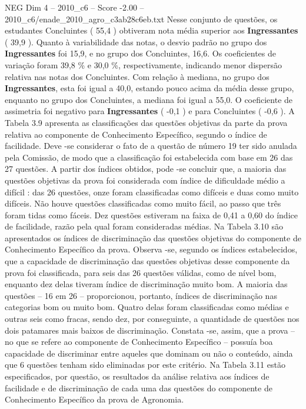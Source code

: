 \begin{textsample}{NEG Dim 4 – 2010\_c6 – Score -2.00 – 2010\_c6/enade\_2010\_agro\_c3ab28c6eb.txt}
Nesse conjunto de questões, os estudantes Concluintes ( 55,4 ) obtiveram nota média superior aos \textbf{Ingressantes} ( 39,9 ).
Quanto à variabilidade das notas, o desvio padrão no grupo dos \textbf{Ingressantes} foi 15,9, e no grupo dos Concluintes, 16,6.
Os coeficientes de variação foram 39,8 \% e 30,0 \%, respectivamente, indicando menor dispersão relativa nas notas dos Concluintes.
Com relação à mediana, no grupo dos \textbf{Ingressantes}, esta foi igual a 40,0, estando pouco acima da média desse grupo, enquanto no grupo dos Concluintes, a mediana foi igual a 55,0.
O coeficiente de assimetria foi negativo para \textbf{Ingressantes} ( -0,1 ) e para Concluintes ( -0,6 ).
A Tabela 3.9 apresenta as classificações das questões objetivas da parte da prova relativa ao componente de Conhecimento Específico, segundo o índice de facilidade.
Deve -se considerar o fato de a questão de número 19 ter sido anulada pela Comissão, de modo que a classificação foi estabelecida com base em 26 das 27 questões.
A partir dos índices obtidos, pode -se concluir que, a maioria das questões objetivas da prova foi considerada com índice de dificuldade médio a difícil : das 26 questões, onze foram classificadas como difíceis e duas como muito difíceis.
Não houve questões classificadas como muito fácil, ao passo que três foram tidas como fáceis.
Dez questões estiveram na faixa de 0,41 a 0,60 do índice de facilidade, razão pela qual foram consideradas médias.
Na Tabela 3.10 são apresentados os índices de discriminação das questões objetivas do componente de Conhecimento Específico da prova.
Observa -se, segundo os índices estabelecidos, que a capacidade de discriminação das questões objetivas desse componente da prova foi classificada, para seis das 26 questões válidas, como de nível bom, enquanto dez delas tiveram índice de discriminação muito bom.
A maioria das questões – 16 em 26 – proporcionou, portanto, índices de discriminação nas categorias bom ou muito bom.
Quatro delas foram classificadas como médias e outras seis como fracas, sendo dez, por conseguinte, a quantidade de questões nos dois patamares mais baixos de discriminação.
Constata -se, assim, que a prova – no que se refere ao componente de Conhecimento Específico – possuía boa capacidade de discriminar entre aqueles que dominam ou não o conteúdo, ainda que 6 questões tenham sido eliminadas por este critério.
Na Tabela 3.11 estão especificados, por questão, os resultados da análise relativa aos índices de facilidade e de discriminação de cada uma das questões do componente de Conhecimento Específico da prova de Agronomia.

\end{textsample}
